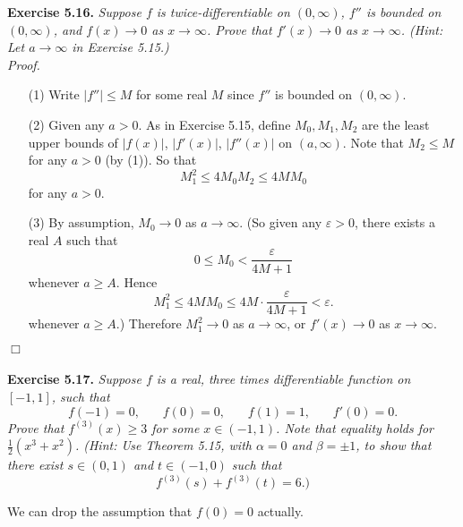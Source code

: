\documentclass{article}
\begin{document}
\textbf{Exercise 5.16.}
\emph{Suppose $f$ is twice-differentiable on $(0,\infty)$,
$f''$ is bounded on $(0,\infty)$,
and $f(x) \to 0$ as $x \to \infty$.
Prove that $f'(x) \to 0$ as $x \to \infty$.
(Hint: Let $a \to \infty$ in Exercise 5.15.)} \\

\emph{Proof.}
\begin{enumerate}
\item[(1)]
Write $|f''| \leq M$ for some real $M$ since $f''$ is bounded on $(0,\infty)$.

\item[(2)]
Given any $a > 0$.
As in Exercise 5.15, define $M_0, M_1, M_2$ are the least upper bounds of
$|f(x)|$, $|f'(x)|$, $|f''(x)|$ on $(a,\infty)$.
Note that $M_2 \leq M$ for any $a > 0$ (by (1)).
So that
\[
  M_1^2 \leq 4 M_0 M_2 \leq 4M M_0
\]
for any $a > 0$.

\item[(3)]
By assumption, $M_0 \to 0$ as $a \to \infty$.
(So given any $\varepsilon > 0$, there exists a real $A$ such that
\[
  0 \leq M_0 < \frac{\varepsilon}{4M + 1}
\]
whenever $a \geq A$.
Hence
\[
  M_1^2 \leq 4M M_0 \leq 4M \cdot \frac{\varepsilon}{4M + 1} < \varepsilon.
\]
whenever $a \geq A$.)
Therefore $M_1^2 \to 0$ as $a \to \infty$,
or $f'(x) \to 0$ as $x \to \infty$.
\end{enumerate}
$\Box$ \\\\






\textbf{Exercise 5.17.}
\emph{Suppose $f$ is a real, three times differentiable function on $[-1,1]$, such that
\[
  f(-1)=0, \:\:\:\:\:\:\:\:
  f(0)=0, \:\:\:\:\:\:\:\:
  f(1)=1, \:\:\:\:\:\:\:\:
  f'(0)=0.
\]
Prove that $f^{(3)}(x) \geq 3$ for some $x \in (-1,1)$.
Note that equality holds for $\frac{1}{2}(x^3+x^2)$.
(Hint: Use Theorem 5.15, with $\alpha = 0$ and $\beta=\pm 1$,
to show that there exist $s \in (0,1)$ and $t \in (-1,0)$ such that
\[
  f^{(3)}(s) + f^{(3)}(t) = 6.)
\]}

We can drop the assumption that $f(0)=0$ actually. \\
\end{document}
